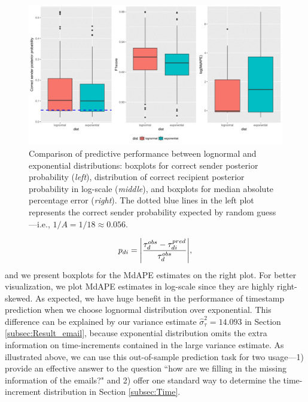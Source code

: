 \documentclass[ba]{imsart}
\numberwithin{equation}{section}
\theoremstyle{plain}
\DeclarePairedDelimiter\abs{\lvert}{\rvert}
\begin{document}
	\begin{figure}[!t]
		\centering
		\includegraphics[width=1\textwidth]{img/PPEplotnew-1.png}	
		\caption {Comparison of predictive performance between lognormal and exponential distributions: boxplots for correct sender posterior probability (\textit{left}), distribution of correct recipient posterior probability in log-scale (\textit{middle}), and boxplots for median absolute percentage error (\textit{right}). The dotted blue lines in the left plot represents the correct sender probability expected by random guess---i.e., $1/A=1/18\approx0.056$.}
		\label{figure:PPEresults}
	\end{figure}
	\begin{equation*}
	p_{di} = \abs*{\frac{\tau^{obs}_d - \tau^{pred}_{di}}{\tau^{obs}_d}},
	\end{equation*}
	and we present boxplots for the MdAPE estimates on the right plot. For better visualization, we plot MdAPE estimates in log-scale since they are highly right-skewed. As expected, we have huge benefit in the performance of timestamp prediction when we choose lognormal distribution over exponential. This difference can be explained by our variance estimate $\hat{\sigma}_\tau^2= 14.093$ in Section \ref{subsec:Result_email}, because exponential distribution omits the extra information on time-increments contained in the large variance estimate. As illustrated above, we can use this out-of-sample prediction task for two usage---1) provide an effective answer to the question ``how are we filling in the missing information of the emails?" and 2) offer one standard way to determine the time-increment distribution in Section \ref{subsec:Time}. 
\end{document}

